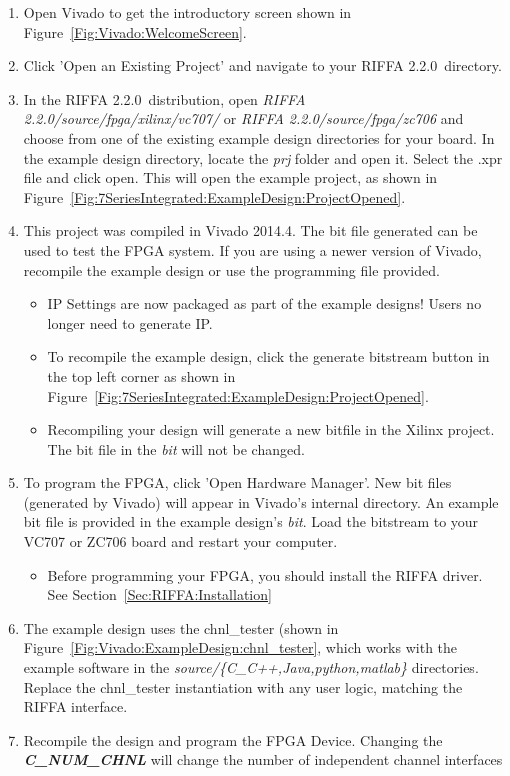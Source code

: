 \documentclass{refrep}
\newcommand{\VivadoVer}{2014.4}
\newcommand{\RIFFAVer}{2.2.0}
\newcommand{\Directory}[1]{\textit{#1}}
\newcommand{\RIFFAParameter}[1]{\textit{\textbf{#1}}}
\begin{document}
\begin{enumerate}
\item Open Vivado to get the introductory screen shown in
  Figure~\ref{Fig:Vivado:WelcomeScreen}.
\item Click 'Open an Existing Project' and navigate to your RIFFA
  \RIFFAVer~directory.
\item In the RIFFA \RIFFAVer~distribution, open \Directory{RIFFA
  \RIFFAVer/source/fpga/xilinx/vc707/} or \Directory{RIFFA
  \RIFFAVer/source/fpga/zc706} and choose from one of the existing example
  design directories for your board. In the example design directory, locate the
  \Directory{prj} folder and open it. Select the .xpr file and click open. This
  will open the example project, as shown in
  Figure~\ref{Fig:7SeriesIntegrated:ExampleDesign:ProjectOpened}.
\item This project was compiled in Vivado \VivadoVer. The bit file generated can
  be used to test the FPGA system. If you are using a newer version of Vivado,
  recompile the example design or use the programming file provided.
  \begin{itemize}
  \item IP Settings are now packaged as part of the example designs! Users no
    longer need to generate IP.
  \item To recompile the example design, click the generate bitstream button in
    the top left corner as shown in
    Figure~\ref{Fig:7SeriesIntegrated:ExampleDesign:ProjectOpened}.
  \item Recompiling your design will generate a new bitfile in the Xilinx
    project. The bit file in the \Directory{bit} will not be changed.
  \end{itemize}
\item To program the FPGA, click 'Open Hardware Manager'. New bit files
  (generated by Vivado) will appear in Vivado's internal directory. An example
  bit file is provided in the example design's \Directory{bit}. Load the
  bitstream to your VC707 or ZC706 board and restart your computer.
  \begin{itemize}
  \item Before programming your FPGA, you should install the RIFFA driver. See
    Section~\ref{Sec:RIFFA:Installation}
  \end{itemize}
\item The example design uses the chnl\_tester (shown in
  Figure~\ref{Fig:Vivado:ExampleDesign:chnl_tester}, which works with
  the example software in the \Directory{source/\{C\_C++,Java,python,matlab\}}
  directories. Replace the chnl\_tester instantiation with any user logic,
  matching the RIFFA interface.
\item Recompile the design and program the FPGA Device. Changing the
  \RIFFAParameter{C\_NUM\_CHNL} will change the number of independent channel
  interfaces
\end{enumerate}
\end{document}
